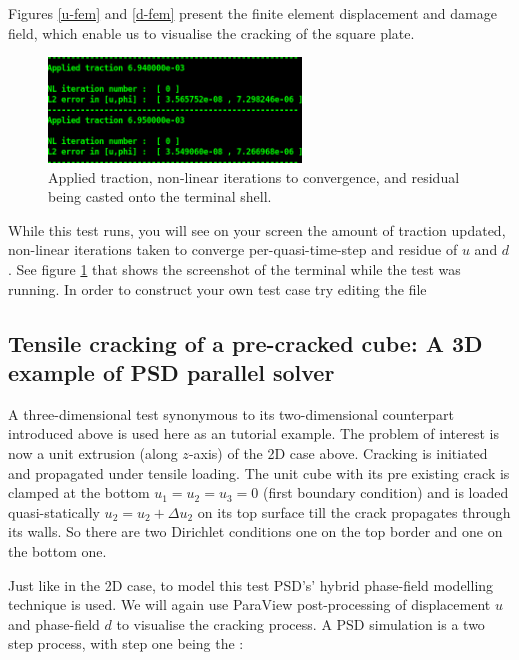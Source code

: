 {{Figures \ref{u-fem} and \ref{d-fem} present the finite element displacement and damage field, which enable us to visualise the cracking of the square plate.



\begin{figure}[h!]
	\centering
	
	\includegraphics[width=0.6\textwidth]{./Images/terminal1.png}
	\caption{Applied traction, non-linear iterations to convergence, and residual being casted onto the terminal shell. \label{term}}
\end{figure}

While this test runs, you will see on your screen the amount of traction updated, non-linear iterations taken to converge per-quasi-time-step and residue of $u$ and $d$. See figure \ref{term} that shows the screenshot of the terminal while the test was running.  In order to construct your own test case try editing the   file   







\subsection{Tensile cracking of a pre-cracked cube: A 3D example of PSD parallel solver}

A three-dimensional test synonymous to its two-dimensional counterpart introduced above is used here as an tutorial example.   The problem of interest is now a unit extrusion (along $z$-axis) of the 2D case above. Cracking is initiated and propagated under tensile loading. The unit cube with its  pre existing crack  is clamped at the bottom $u_1=u_2=u_3=0$ (first boundary condition) and is loaded quasi-statically $u_2=u_2 + \Delta u_2$ on its top surface till the crack propagates through its walls. So there are two Dirichlet conditions one on the top border and one on the bottom one.

Just like in the 2D case, to model this test PSD's' hybrid phase-field modelling  technique is used. We will again use ParaView post-processing of displacement $u$ and phase-field $d$ to visualise the cracking process. A PSD simulation is a two step process, with step one being the  :

}}
